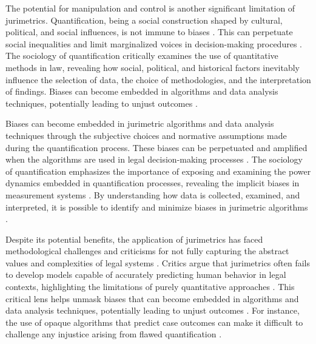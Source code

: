 The potential for manipulation and control is another significant limitation of jurimetrics. Quantification, being a social construction shaped by cultural, political, and social influences, is not immune to biases \cite{10.1590/data.2022.65.3.267,10.3390/fi9040068}. This can perpetuate social inequalities and limit marginalized voices in decision-making procedures \cite{10.1590/data.2022.65.3.267,10.3390/fi9040068}. The sociology of quantification critically examines the use of quantitative methods in law, revealing how social, political, and historical factors inevitably influence the selection of data, the choice of methodologies, and the interpretation of findings. Biases can become embedded in algorithms and data analysis techniques, potentially leading to unjust outcomes \cite{10.1590/data.2022.65.3.267,10.1057/s41599-020-00557-0}.

Biases can become embedded in jurimetric algorithms and data analysis techniques through the subjective choices and normative assumptions made during the quantification process. These biases can be perpetuated and amplified when the algorithms are used in legal decision-making processes \cite{10.1590/data.2022.65.3.267,10.1007/978-3-319-44000-215}. The sociology of quantification emphasizes the importance of exposing and examining the power dynamics embedded in quantification processes, revealing the implicit biases in measurement systems \cite{10.1057/s41599-020-00557-0,10.1080/07329113.2015.1046739}. By understanding how data is collected, examined, and interpreted, it is possible to identify and minimize biases in jurimetric algorithms \cite{10.1590/data.2022.65.3.267,10.1007/978-3-319-44000-215}.

Despite its potential benefits, the application of jurimetrics has faced methodological challenges and criticisms for not fully capturing the abstract values and complexities of legal systems \cite{nunes2016jurimetria}. Critics argue that jurimetrics often fails to develop models capable of accurately predicting human behavior in legal contexts, highlighting the limitations of purely quantitative approaches \cite{nunes2016jurimetria}. This critical lens helps unmask biases that can become embedded in algorithms and data analysis techniques, potentially leading to unjust outcomes \cite{10.1590/data.2022.65.3.267,10.3390/fi9040068}. For instance, the use of opaque algorithms that predict case outcomes can make it difficult to challenge any injustice arising from flawed quantification \cite{10.1590/data.2022.65.3.267,10.1057/s41599-020-0396-5}.

